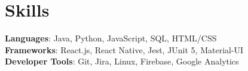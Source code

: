\documentclass[letterpaper,11pt]{article}
\begin{document}
\section{Skills}
 \begin{itemize}[leftmargin=0.15in, label={}]
    \small{\item{
     \textbf{Languages}{: Java, Python, JavaScript, SQL, HTML/CSS} \\
     \textbf{Frameworks}{: React.js, React Native, Jest, JUnit 5, Material-UI} \\
     \textbf{Developer Tools}{: Git, Jira, Linux, Firebase, Google Analytics} \\
    }}
 \end{itemize}

\end{document}
